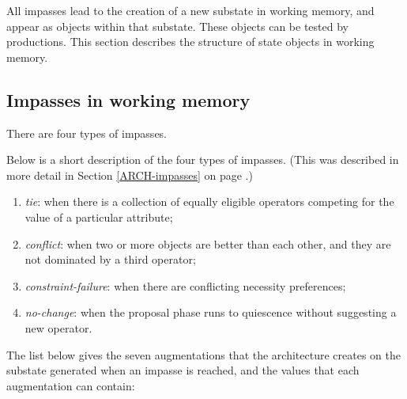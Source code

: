 All impasses lead to the creation of a new substate in working memory, and appear as objects within that substate. These objects can be tested by productions. This section describes the structure of state objects in working memory.

\subsection{Impasses in working memory}
\label{SYNTAX-impasses-aug}

There are four types of impasses. 

Below is a short description of the four types of impasses. (This was described in more detail in Section \ref{ARCH-impasses} on page \pageref{ARCH-impasses}.)

\vspace{-12pt}
\begin{enumerate}
\item \emph{tie}: when there is a collection of equally eligible operators competing for the value of a particular attribute;
\vspace{-8pt}
\item \emph{conflict}: when two or more objects are better than each other, and they are not dominated by a third operator;
\vspace{-8pt}
\item \emph{constraint-failure}: when there are conflicting necessity preferences; 
\vspace{-8pt}
\item \emph{no-change}: when the proposal phase runs to quiescence without suggesting a new operator.
\vspace{-8pt}
\end{enumerate}

The list below gives the seven augmentations that the architecture creates on the substate generated when an impasse is reached, and the values that each augmentation can contain:

